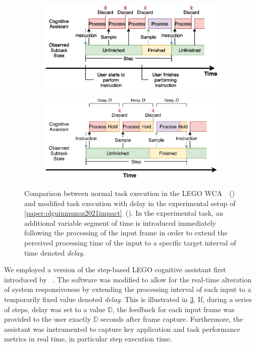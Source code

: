 \begin{figure}[tb]
    \centering
    \begin{subfigure}[t]{.49\textwidth}
        \centering
        \includegraphics[width=\textwidth]{publications/2021ImpactDelayedResponse/Fig4a}
        \caption{}\label{sfig:regularwcaexec}
    \end{subfigure}%
    \hfill%
    \begin{subfigure}[t]{.49\textwidth}
        \centering
        \includegraphics[width=\textwidth]{publications/2021ImpactDelayedResponse/Fig4b}
        \caption{}\label{sfig:delaywcaexec}
    \end{subfigure}
    \caption{%
        Comparison between normal task execution in the LEGO \gls{WCA}~\cite{chen2015early}~() and modified task execution with delay in the experimental setup of \cref{paper:olguinmunoz2021impact}~().
        In the experimental task, an additional variable segment of time is introduced immediately following the processing of the input frame in order to extend the perceived processing time of the input to a specific target interval of time denoted \emph{delay}.
    }\label{fig:regularwca-vs-delaywca}
\end{figure}

We employed a version of the step-based LEGO cognitive assistant first introduced by \citeauthor{chen2015early}~\cite{chen2015early}.
The software was modified to allow for the real-time alteration of system responsiveness by extending the processing interval of each input to a temporarily fixed value denoted \emph{delay}.
This is illustrated in \cref{fig:regularwca-vs-delaywca}.
If, during a series of steps, delay was set to a value \ensuremath{\mathbb{D}}, the feedback for each input frame was provided to the user exactly \ensuremath{\mathbb{D}} seconds after frame capture.
Furthermore, the assistant was instrumented to capture key application and task performance metrics in real time, in particular step execution time.

